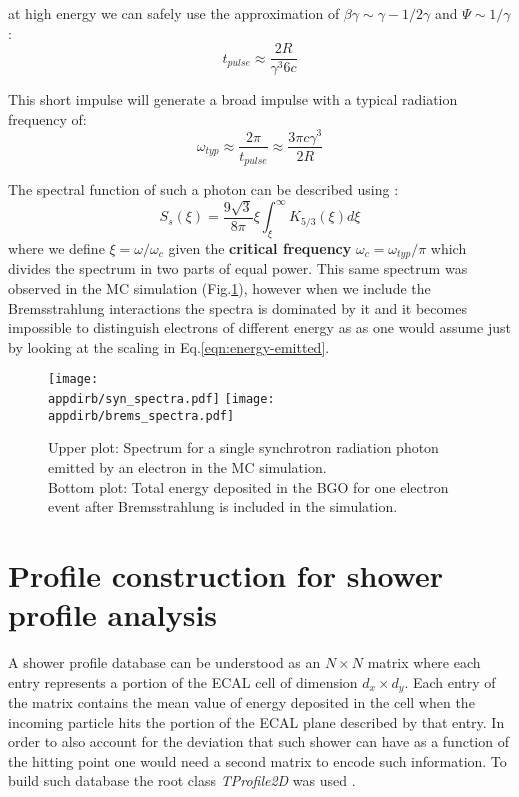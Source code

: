 at high energy we can safely use the approximation of $\beta \gamma \sim \gamma - 1/2\gamma$ and $\Psi \sim 1/\gamma$:
\[t_{pulse} \approx \frac{2 R}{\gamma^3 6c}\]

This short impulse will generate a broad impulse with a typical radiation frequency of:
\[\omega_{typ} \approx \frac{2 \pi}{t_{pulse}} \approx \frac{3 \pi  c \gamma^3}{2 R} \]

The spectral function of such a photon can be described using \cite{synchrotron-radiation}:
\begin{equation}
\label{eqn:sync_spectrum}
S_s(\xi) = \frac{9 \sqrt{3}}{8 \pi}\xi \int_{\xi}^{\infty}K_{5/3}(\xi)d\xi
\end{equation}
where we define $\xi = \omega/\omega_c$ given the \textbf{critical frequency} $\omega_c =\omega_{typ}/\pi$ which divides the spectrum in two parts of equal power. This same spectrum was observed in the MC simulation (Fig.\ref{fig:synch_spectrum}), however when we include the Bremsstrahlung interactions the spectra is dominated by it and it becomes impossible to distinguish electrons of different energy as as one would assume just by looking at the scaling in Eq.\ref{eqn:energy-emitted}.


\begin{figure}[h!]
\centering
\texttt{[image: \\appdirb/syn\_spectra.pdf]}
\texttt{[image: \\appdirb/brems\_spectra.pdf]}
\caption{Upper plot: Spectrum for a single synchrotron radiation photon emitted by an electron in the MC simulation. \\
Bottom plot: Total energy deposited in the BGO for one electron event after Bremsstrahlung is included in the simulation.}
\label{fig:synch_spectrum}
\end{figure}

\FloatBarrier\noindent
\section{Profile construction for shower profile analysis}
\label{Appb:sec:make_profile}

A shower profile database can be understood as an $N\times N$ matrix
where each entry represents a portion of the ECAL cell of dimension
$d_x \times d_y$. Each entry of the matrix contains the mean value of
energy deposited in the cell when the incoming particle hits the
portion of the ECAL plane described by that entry. In order to also
account for the deviation that such shower can have as a function of the
hitting point one would need a second matrix to encode such
information. To build such database the root class \textit{TProfile2D} was used \cite{root-tprofile}.

